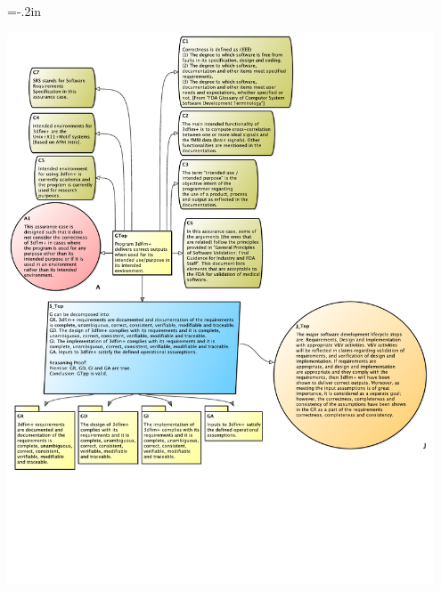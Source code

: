 \documentclass[t,12pt,numbers,fleqn]{beamer}
\begin{document}

\hoffset=-.2in
\begin{frame}[plain]

\includegraphics[width=0.95\textwidth]{../Figures/TopAC.pdf}

\end{frame}
\hoffset=0in

\end{document}
